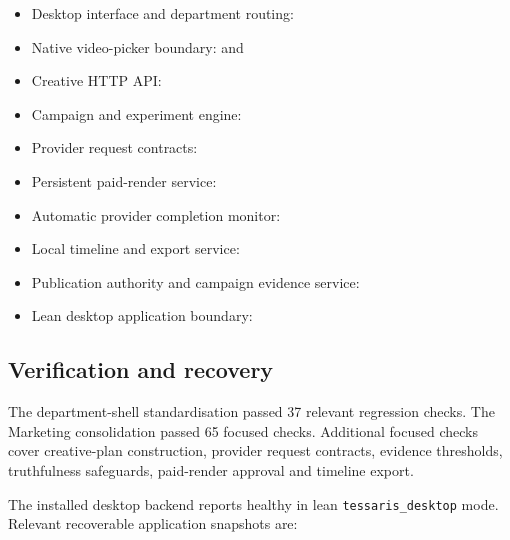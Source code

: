 \begin{itemize}
    \item Desktop interface and department routing:
    \item Native video-picker boundary:
     and
    \item Creative HTTP API:
    \item Campaign and experiment engine:
    \item Provider request contracts:
    \item Persistent paid-render service:
    \item Automatic provider completion monitor:
    \item Local timeline and export service:
    \item Publication authority and campaign evidence service:
    \item Lean desktop application boundary:
\end{itemize}

\subsection{Verification and recovery}

The department-shell standardisation passed 37 relevant regression checks. The
Marketing consolidation passed 65 focused checks. Additional focused checks
cover creative-plan construction, provider request contracts, evidence thresholds,
truthfulness safeguards, paid-render approval and timeline export.

The installed desktop backend reports healthy in lean
\texttt{tessaris\_desktop} mode. Relevant recoverable application snapshots are:

